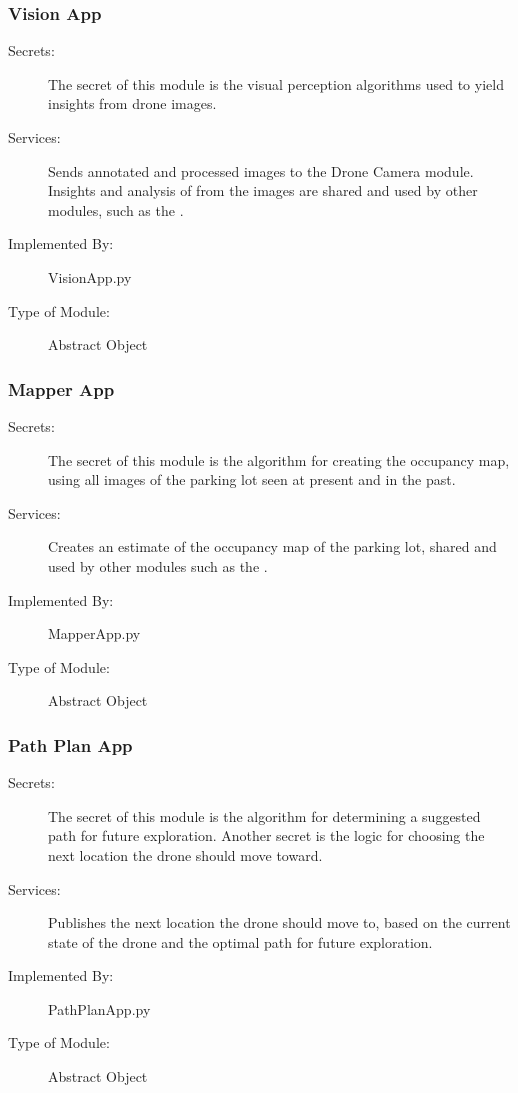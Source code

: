 \documentclass[12pt, titlepage]{article}
\begin{document}
\subsubsection{Vision App}
\label{Vision App}
\begin{description}
\item[Secrets:] The secret of this module is the visual perception algorithms used to yield insights from drone images.
\item[Services:] Sends annotated and processed images to the Drone Camera module. Insights and analysis of from the images are shared and used by other modules, such as the .
\item[Implemented By:] VisionApp.py
\item[Type of Module:] Abstract Object
\end{description}

\subsubsection{Mapper App}
\label{Mapper App}
\begin{description}
\item[Secrets:] The secret of this module is the algorithm for creating the occupancy map, using all images of the parking lot seen at present and in the past.
\item[Services:] Creates an estimate of the occupancy map of the parking lot, shared and used by other modules such as the .
\item[Implemented By:] MapperApp.py
\item[Type of Module:] Abstract Object
\end{description}

\subsubsection{Path Plan App}
\label{Path Plan App}
\begin{description}
\item[Secrets:] The secret of this module is the algorithm for determining a suggested path for future exploration. Another secret is the logic for choosing the next location  the drone should move toward.
\item[Services:] Publishes the next location the drone should move to, based on the current state of the drone and the optimal path for future exploration.
\item[Implemented By:] PathPlanApp.py 
\item[Type of Module:] Abstract Object
\end{description}
\end{document}
